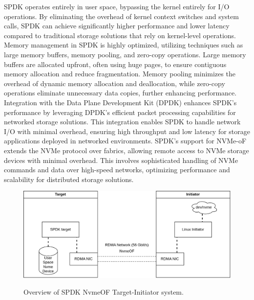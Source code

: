 \documentclass[nonacm,sigplan]{acmart}
\begin{document}
\par SPDK operates entirely in user space, bypassing the kernel entirely for I/O operations. By eliminating the overhead of kernel context switches and system calls, SPDK can achieve significantly higher performance and lower latency compared to traditional storage solutions that rely on kernel-level operations. Memory management in SPDK is highly optimized, utilizing techniques such as large memory buffers, memory pooling, and zero-copy operations. Large memory buffers are allocated upfront, often using huge pages, to ensure contiguous memory allocation and reduce fragmentation. Memory pooling minimizes the overhead of dynamic memory allocation and deallocation, while zero-copy operations eliminate unnecessary data copies, further enhancing performance. Integration with the Data Plane Development Kit (DPDK) enhances SPDK's performance by leveraging DPDK's efficient packet processing capabilities for networked storage solutions. This integration enables SPDK to handle network I/O with minimal overhead, ensuring high throughput and low latency for storage applications deployed in networked environments. SPDK's support for NVMe-oF extends the NVMe protocol over fabrics, allowing remote access to NVMe storage devices with minimal overhead. This involves sophisticated handling of NVMe commands and data over high-speed networks, optimizing performance and scalability for distributed storage solutions.
\begin{figure}[H]
\includegraphics[scale=0.18]{figures/spdk-target.png}\\
\caption{Overview of SPDK NvmeOF Target-Initiator system.}
\label{fig:spdk}
\end{figure}
\end{document}
